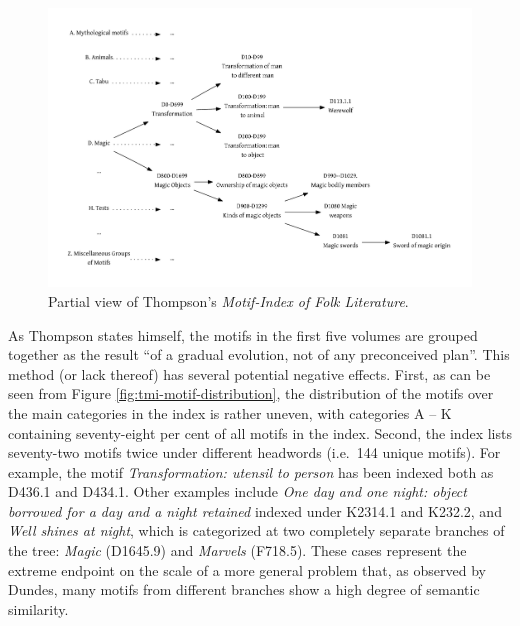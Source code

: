 \begin{figure}
    \centering
    \includegraphics[width=\textwidth]{images/thompson-tree.pdf}
    \caption{Partial view of Thompson's \emph{Motif-Index of Folk Literature}.}
    \label{fig:thompson-tree}
\end{figure}

As Thompson states himself, the motifs in the first five volumes are grouped together as the result ``of a gradual evolution, not of any preconceived plan''\autocite[19]{thompson:1955}. This method (or lack thereof) has several potential negative effects. First, as can be seen from Figure \ref{fig:tmi-motif-distribution}, the distribution of the motifs over the main categories in the index is rather uneven, with categories A -- K containing seventy-eight per cent of all motifs in the index. Second, the index lists seventy-two motifs twice under different headwords (i.e.\ 144 unique motifs). For example, the motif \emph{Transformation: utensil to person} has been indexed both as D436.1 and D434.1. Other examples include \emph{One day and one night: object borrowed for a day and a night retained} indexed under K2314.1 and K232.2, and \emph{Well shines at night}, which is categorized at two completely separate branches of the tree: \emph{Magic} (D1645.9) and \emph{Marvels} (F718.5). These cases represent the extreme endpoint on the scale of a more general problem that, as observed by Dundes, many motifs from different branches show a high degree of semantic similarity.\autocite{dundes:1997}

